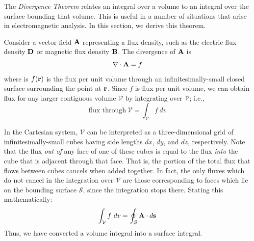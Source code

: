 

\label{m0046_Divergence_Theorem} %

The \emph{Divergence Theorem} relates an integral over a volume to an integral over the surface bounding that volume.
This is useful in a number of situations that arise in electromagnetic analysis.
In this section, we derive this theorem. 

Consider a vector field ${\bf A}$ representing a flux density, such as the electric flux density ${\bf D}$ or magnetic flux density ${\bf B}$.  The divergence of ${\bf A}$ is
%
\begin{equation}
\nabla \cdot {\bf A} = f
\label{m0046_eDivAf}
\end{equation}
%
where is $f({\bf r})$ is the flux per unit volume through an infinitesimally-small closed surface surrounding the point at ${\bf r}$.
Since $f$ is flux per unit volume, we can obtain flux for any larger contiguous volume ${\mathcal V}$ by integrating over ${\mathcal V}$; i.e.,
%
\begin{equation}
\mbox{flux through} ~{\mathcal V} = \int_{\mathcal V} f ~dv
\end{equation}  
  
In the Cartesian system, ${\mathcal V}$ can be interpreted as a three-dimensional grid of infinitesimally-small cubes having side lengths $dx$, $dy$, and $dz$, respectively.  
Note that the flux \emph{out of} any face of one of these cubes is equal to the flux \emph{into} the cube that is adjacent through that face. 
That is, the portion of the total flux that flows between cubes cancels when added together.
In fact, the only fluxes which do not cancel in the integration over ${\mathcal V}$ are those corresponding to faces which lie on the bounding surface ${\mathcal S}$, since the integration stops there.
Stating this mathematically:
%
\begin{equation}
\int_{\mathcal V} f ~dv = \oint_{\mathcal S} {\bf A}\cdot d{\bf s}
\label{m0046_eIntVIntS}
\end{equation}
%
Thus, we have converted a volume integral into a surface integral.

